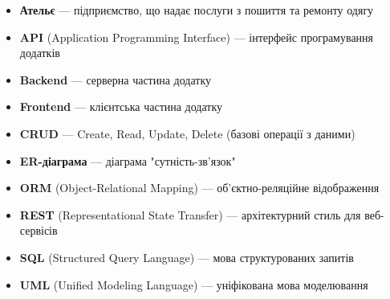 \documentclass[14pt,a4paper]{extarticle}
\begin{document}
\begin{itemize}
    \item \textbf{Ательє} --- підприємство, що надає послуги з пошиття та ремонту одягу
    \item \textbf{API} (Application Programming Interface) --- інтерфейс програмування додатків
    \item \textbf{Backend} --- серверна частина додатку
    \item \textbf{Frontend} --- клієнтська частина додатку
    \item \textbf{CRUD} --- Create, Read, Update, Delete (базові операції з даними)
    \item \textbf{ER-діаграма} --- діаграма "сутність-зв'язок"
    \item \textbf{ORM} (Object-Relational Mapping) --- об'єктно-реляційне відображення
    \item \textbf{REST} (Representational State Transfer) --- архітектурний стиль для веб-сервісів
    \item \textbf{SQL} (Structured Query Language) --- мова структурованих запитів
    \item \textbf{UML} (Unified Modeling Language) --- уніфікована мова моделювання
\end{itemize}
\end{document}
